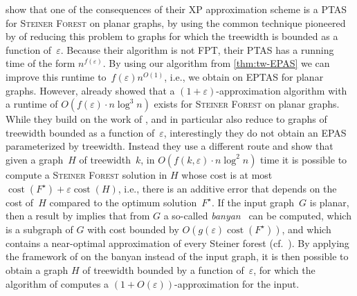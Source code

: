 \documentclass[a4paper]{article}
\let\oldcitet\citet
\renewcommand{\citet}[1]{\mbox{\oldcitet{#1}}}
\theoremstyle{plain}
\newcommand{\eps}{{\varepsilon}}
\newcommand{\pname}[1]{\textsc{#1}}
\DeclareMathOperator{\cost}{cost}
\newcommand{\SF}{\pname{Steiner Forest}\xspace}
\begin{document}
\citet{bateni2011approximation} show that one of the consequences of their XP
approximation scheme is a PTAS for \SF on planar graphs, by using the common
technique pioneered by \citet{baker1994approximation} of reducing this problem
to graphs for which the treewidth is bounded as a function of~$\eps$.  Because
their algorithm is not FPT, their PTAS has a running time of the form
$n^{f(\eps)}$. By using our algorithm from \autoref{thm:tw-EPAS} we can improve
this runtime to~$f(\eps)n^{O(1)}$, i.e., we obtain on EPTAS for planar graphs.
However, \citet{eisenstat2012efficient} already showed that a
$(1+\eps)$-approximation algorithm with a runtime of $O(f(\eps)\cdot n\log^3
n)$ exists for \SF on planar graphs. While they build on the work of
\citet{bateni2011approximation}, and in particular also reduce to graphs of
treewidth bounded as a function of~$\eps$, interestingly they do not obtain an
EPAS parameterized by treewidth.  Instead they use a different route and show
that given a graph~$H$ of treewidth~$k$, in $O(f(k,\eps)\cdot n\log^2 n)$ time
it is possible to compute a \SF solution in $H$ whose cost is at most
$\cost(F^\star)+\eps\cost(H)$, i.e., there is an additive error that depends on
the cost of~$H$ compared to the optimum solution~$F^\star$. If the input
graph~$G$ is planar, then a result by \citet{borradaile2009n} implies that from
$G$ a so-called \emph{banyan}~\cite{rao1998approximating, bartal2021near} can
be computed, which is a subgraph of $G$ with cost bounded by
$O(g(\eps)\cost(F^\star))$, and which contains a near-optimal approximation of
every Steiner forest (cf.~\cite[Lemma~2.1]{eisenstat2012efficient}). By
applying the framework of \citet{bateni2011approximation} on the banyan instead
of the input graph, it is then possible to obtain a graph $H$ of treewidth
bounded by a function of~$\eps$, for which the algorithm of
\citet{eisenstat2012efficient} computes a $(1+O(\eps))$-approximation for the
input. 
\end{document}
